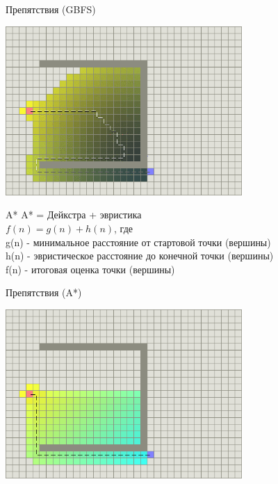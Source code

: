 \documentclass[10pt]{beamer}
\begin{document}
\begin{frame}[fragile]{Препятствия (GBFS)}
\begin{center}
\includegraphics[width=9cm]{Term_2/Source/images/best-first-search-trap.png}
\end{center}
\end{frame}

\begin{frame}[fragile]{A*}
A* = Дейкстра + эвристика\\
$f(n) = g(n) + h(n)$, где \\
g(n) - минимальное расстояние от стартовой точки (вершины)\\
h(n) - эвристическое расстояние до конечной точки (вершины)\\
f(n) - итоговая оценка точки (вершины) \\
\end{frame}

\begin{frame}[fragile]{Препятствия (A*)}
\begin{center}
\includegraphics[width=9cm]{Term_2/Source/images/a-star-trap.png}
\end{center}
\end{frame}
\end{document}
